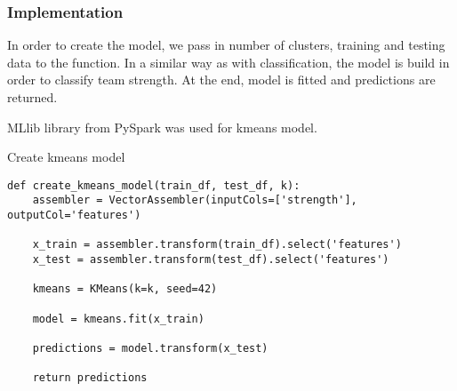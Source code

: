 \subsubsection{Implementation}

In order to create the model, we pass in number of clusters, training and testing data to the function. In a similar way as with classification, the model is build in order to classify team strength. At the end, model is fitted and predictions are returned.

MLlib library from PySpark was used for kmeans model.
\begin{listing}[H]
\caption{Create kmeans model}
\begin{verbatim}
def create_kmeans_model(train_df, test_df, k):
    assembler = VectorAssembler(inputCols=['strength'], outputCol='features')

    x_train = assembler.transform(train_df).select('features')
    x_test = assembler.transform(test_df).select('features')

    kmeans = KMeans(k=k, seed=42)

    model = kmeans.fit(x_train)

    predictions = model.transform(x_test)

    return predictions
\end{verbatim}
\end{listing}